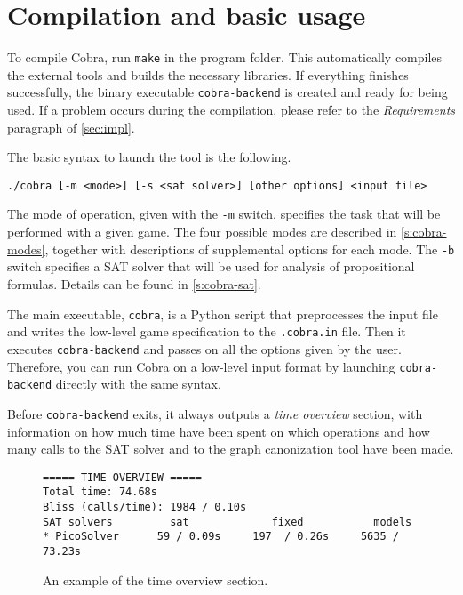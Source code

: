 \section{Compilation and basic usage}

To compile Cobra, run \texttt{make} in the program folder.
This automatically compiles the external tools and builds the necessary libraries.
If everything finishes successfully,
  the binary executable \texttt{cobra-backend} is created
  and ready for being used.
If a problem occurs during the compilation, please refer to the \emph{Requirements}
paragraph of \autoref{sec:impl}.

The basic syntax to launch the tool is the following.

\medskip
\centerline{\texttt{./cobra [-m <mode>] [-s <sat solver>] [other options] <input file>}}
\medskip

The mode of operation, given with the \texttt{-m} switch,
  specifies the task that will be performed with a given game.
The four possible modes are described in \autoref{s:cobra-modes},
  together with descriptions
  of supplemental options for each mode.
The \texttt{-b} switch specifies a SAT solver that will be used for analysis of propositional formulas.
Details can be found in \autoref{s:cobra-sat}.

The main executable, \texttt{cobra}, is a Python script that preprocesses
  the input file and writes the low-level game specification to the \texttt{.cobra.in} file.
Then it executes \texttt{cobra-backend} and passes on all the options given
  by the user.
Therefore, you can run Cobra on a low-level input format by launching
  \texttt{cobra-backend} directly with the same syntax.

Before \texttt{cobra-backend} exits, it always outputs a \emph{time overview} section,
  with information on how much time have been spent on which operations and
  how many calls to the SAT solver and to the graph canonization tool have been made.

\begin{figure}[ht]
\begin{lstlisting}
===== TIME OVERVIEW =====
Total time: 74.68s
Bliss (calls/time): 1984 / 0.10s
SAT solvers         sat             fixed           models
* PicoSolver      59 / 0.09s     197  / 0.26s     5635 / 73.23s
\end{lstlisting}
\caption{An example of the time overview section.}
\label{fig:timeoverview}
\end{figure}


